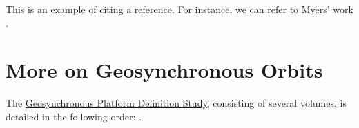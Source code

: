 \documentclass{article}
\begin{document}
This is an example of citing a reference. For instance, we can refer to Myers' work \cite{Myers1973_ExecSummary}.

\section{More on Geosynchronous Orbits}
The \href{https://ntrs.nasa.gov/search?q=Geosynchronous\%20platform\%20definition\%20study}{Geosynchronous Platform Definition Study}, consisting of several volumes, is detailed in the following order:
\cite{Myers1973_ExecSummary, Myers1973_BaselineTraffic, Myers1973_StudySummary, 
      Myers1973_PlatformSynthesis, Myers1973_TransportationRequirements, 
      Myers1973_ProgramEvaluation}.

\printbibliography
\end{document}
